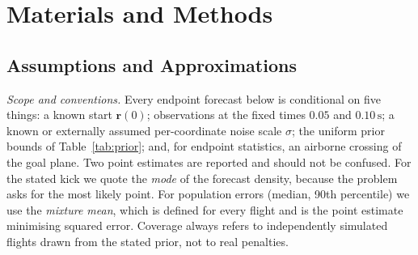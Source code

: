 \documentclass[11pt,a4paper]{article}
\begin{document}
\section{Materials and Methods}
\subsection{Assumptions and Approximations}

\emph{Scope and conventions.} Every endpoint forecast below is conditional on five things: a known start $\mathbf{r}(0)$; observations at the fixed times $0.05$ and $0.10\,\mathrm{s}$; a known or externally assumed per-coordinate noise scale $\sigma$; the uniform prior bounds of Table~\ref{tab:prior}; and, for endpoint statistics, an airborne crossing of the goal plane. Two point estimates are reported and should not be confused. For the stated kick we quote the \emph{mode} of the forecast density, because the problem asks for the most likely point. For population errors (median, 90th percentile) we use the \emph{mixture mean}, which is defined for every flight and is the point estimate minimising squared error. Coverage always refers to independently simulated flights drawn from the stated prior, not to real penalties.
\end{document}
